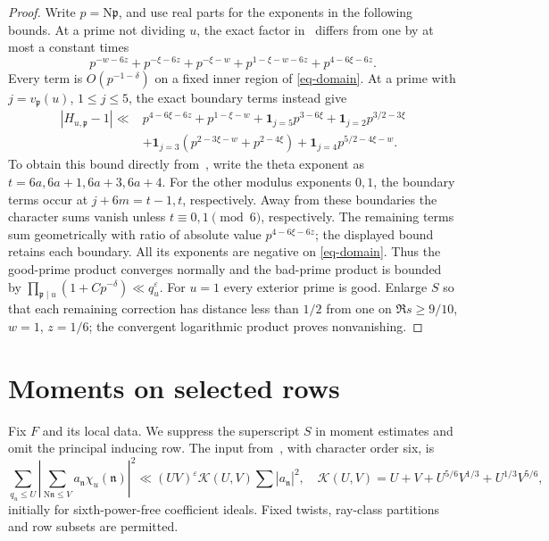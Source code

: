 \documentclass[11pt,a4paper]{article}
\numberwithin{equation}{section}
\theoremstyle{remark}
\newcommand{\eps}{\varepsilon}
\newcommand{\K}{\mathcal K}
\newcommand{\N}{\mathrm N}
\newcommand{\one}{\mathbf 1}
\begin{document}
\begin{proof}
Write $p=\N\mathfrak p$, and use real parts for the exponents
in the following bounds.  At a prime not dividing $u$, the exact
factor in~\cite[(7.19)]{OAI} differs from one by at most a constant
times
\[
 p^{-w-6z}+p^{-\xi-6z}+p^{-\xi-w}
       +p^{1-\xi-w-6z}+p^{4-6\xi-6z}.
\]
Every term is $O(p^{-1-\delta})$ on a fixed inner region of
\eqref{eq-domain}.  At a prime with $j=v_{\mathfrak p}(u)$,
$1\le j\le5$, the exact boundary terms instead give
\begin{align*}
 |H_{u,\mathfrak p}-1|\ll{}&p^{4-6\xi-6z}+p^{1-\xi-w}
 +\one_{j=5}p^{3-6\xi}+\one_{j=2}p^{3/2-3\xi}\\
 &+\one_{j=3}(p^{2-3\xi-w}+p^{2-4\xi})
 +\one_{j=4}p^{5/2-4\xi-w}.
\end{align*}
To obtain this bound directly from~\cite[(7.17)]{OAI}, write the
theta exponent as $t=6a,6a+1,6a+3,6a+4$.  For the other modulus
exponents $0,1$, the boundary terms occur at $j+6m=t-1,t$,
respectively.  Away from these boundaries the character sums
vanish unless $t\equiv0,1\pmod6$, respectively.  The remaining
terms sum geometrically with ratio of absolute value
$p^{4-6\xi-6z}$; the displayed bound retains each boundary.
All its exponents are negative on \eqref{eq-domain}.
Thus the good-prime product converges normally and the bad-prime
product is bounded by
$\prod_{\mathfrak p\mid u}(1+Cp^{-\delta})\ll q_u^\eps$.
For $u=1$ every exterior prime is good.  Enlarge $S$ so that each
remaining correction has distance less than $1/2$ from one on
$\Re s\ge9/10$, $w=1$, $z=1/6$; the convergent logarithmic
product proves nonvanishing.
\end{proof}

\section{Moments on selected rows}\label{sec-moments}

Fix $F$ and its local data.  We suppress the superscript $S$ in
moment estimates and omit the principal inducing row.  The input
from~\cite[Theorem~1.1]{DF}, with character order six, is
\begin{equation}\label{eq-ls}
 \sum_{q_u\le U}\left|\sum_{\N\mathfrak n\le V}
 a_{\mathfrak n}\chi_u(\mathfrak n)\right|^2
 \ll(UV)^\eps\K(U,V)\sum|a_{\mathfrak n}|^2,
 \quad
 \K(U,V)=U+V+U^{5/6}V^{1/3}+U^{1/3}V^{5/6},
\end{equation}
initially for sixth-power-free coefficient ideals.  Fixed twists,
ray-class partitions and row subsets are permitted.
\end{document}
